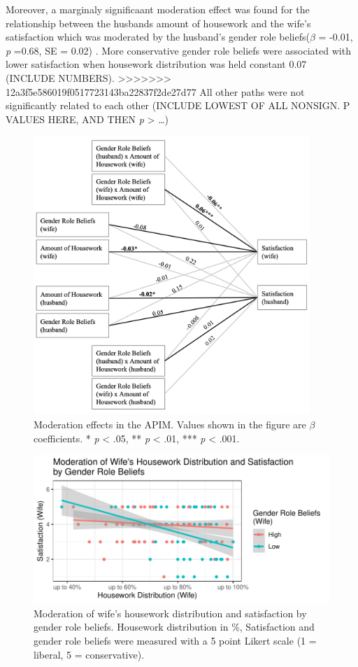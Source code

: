 \documentclass[
  man,floatsintext]{apa6}
\begin{document}
Moreover, a marginaly significaant moderation effect was found for the relationship between the husbands amount of housework and the wife's satisfaction which was moderated by the husband's gender role beliefs(\(\beta\) = -0.01, \emph{p} =0.68, SE = 0.02) . More conservative gender role beliefs were associated with lower satisfaction when housework distribution was held constant 0.07 (INCLUDE NUMBERS).
>>>>>>> 12a3f5e586019f0517723143ba22837f2de27d77
All other paths were not significantly related to each other (INCLUDE LOWEST OF ALL NONSIGN. P VALUES HERE, AND THEN \emph{p} \textgreater{} \ldots)




\begin{figure}
\includegraphics[width=4.11in]{moderation} \caption{Moderation effects in the APIM. Values shown in the figure are \(\beta\) coefficients.
* \emph{p} \textless{} .05, ** \emph{p} \textless{} .01, *** \emph{p} \textless{} .001.}\label{fig:unnamed-chunk-9}
\end{figure}



\begin{figure}
\centering
\includegraphics{results_files/figure-latex/unnamed-chunk-12-1.pdf}
\caption{\label{fig:unnamed-chunk-12}Moderation of wife's housework distribution and satisfaction by gender role beliefs. Housework distribution in \%, Satisfaction and gender role beliefs were measured with a 5 point Likert scale (1 = liberal, 5 = conservative).}
\end{figure}
\end{document}
